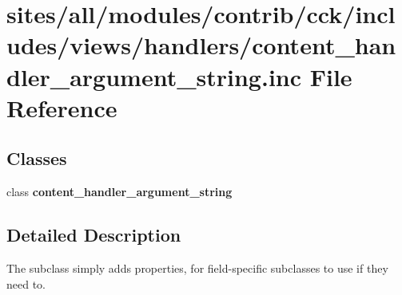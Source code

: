 \hypertarget{content__handler__argument__string_8inc}{
\section{sites/all/modules/contrib/cck/includes/views/handlers/content\_\-handler\_\-argument\_\-string.inc File Reference}
\label{content__handler__argument__string_8inc}
}
\subsection*{Classes}
\begin{CompactItemize}
\item 
class \textbf{content\_\-handler\_\-argument\_\-string}
\end{CompactItemize}


\subsection{Detailed Description}
The subclass simply adds properties, for field-specific subclasses to use if they need to. 